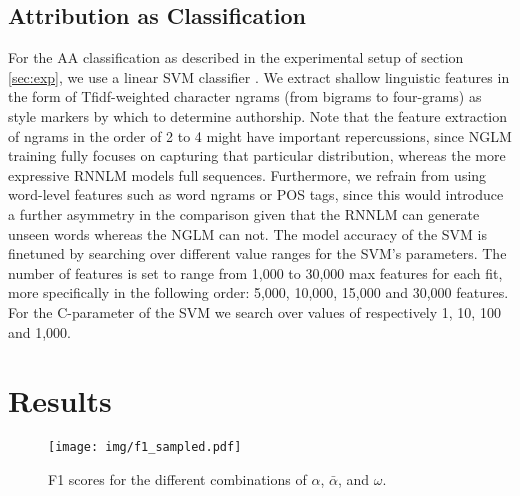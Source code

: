 \documentclass[11pt]{article}
\begin{document}
\subsection{Attribution as Classification}\label{sec:txtsvm}
For the AA classification as described in the experimental setup of section \ref{sec:exp}, we use a linear SVM classifier \cite{diederich2003}. 
We extract shallow linguistic features in the form of Tfidf-weighted character ngrams (from bigrams to four-grams) as style markers by which to determine authorship. Note that the feature extraction of ngrams in the order of 2 to 4 might have important repercussions, since NGLM training fully focuses on capturing that particular distribution, whereas the more expressive RNNLM models full sequences. Furthermore, we refrain from using word-level features such as word ngrams or POS tags, since this would introduce a further asymmetry in the comparison given that the RNNLM can generate unseen words whereas the NGLM can not.
The model accuracy of the SVM is finetuned by searching over different value ranges for the SVM's parameters. 
The number of features is set to range from 1,000 to 30,000 max features for each fit, more specifically in the following order: 5,000, 10,000, 15,000 and 30,000 features. For the C-parameter of the SVM we search over values of respectively 1, 10, 100 and 1,000.

\section{Results}

\begin{figure*}[t]
	\centering
	\texttt{[image: img/f1\_sampled.pdf]}
   	\caption{
	F1 scores for the different combinations of $\alpha$, $\bar{\alpha}$, and $\omega$.
   	}
   	\label{fig:f1}
\end{figure*}
\end{document}
